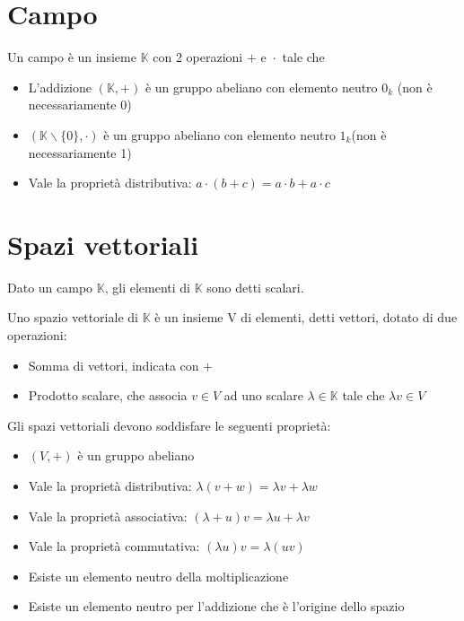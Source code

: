 \documentclass[a4paper, 10pt]{article}
\begin{document}
\section{Campo}

Un campo è un insieme $ \mathbb{K} $ con 2 operazioni $ + \text{ e } \cdot $ tale che

\begin{itemize}
	\item L'addizione $(\mathbb{K}, +)$ è un gruppo abeliano con elemento neutro $ 0_k $ (non è necessariamente 0)
	\item $(\mathbb{K} \backslash \{0\}, \cdot)$ è un gruppo abeliano con elemento neutro $ 1_k $(non è necessariamente 1)
	\item Vale la proprietà distributiva: $ a \cdot (b+c)=a \cdot b+a \cdot c $
\end{itemize}

\section{Spazi vettoriali}

Dato un campo $ \mathbb{K} $, gli elementi di $ \mathbb{K} $ sono detti scalari.

Uno spazio vettoriale di $ \mathbb{K} $ è un insieme V di elementi, detti vettori, dotato di due operazioni:

\begin{itemize}
	\item Somma di vettori, indicata con $ + $
	\item Prodotto scalare, che associa $ v \in V $ ad uno scalare $ \lambda \in \mathbb{K} $ tale che $ \lambda v \in V$
\end{itemize}

Gli spazi vettoriali devono soddisfare le seguenti proprietà:

\begin{itemize}
	\item $ (V, +) $ è un gruppo abeliano
	\item Vale la proprietà distributiva: $ \lambda\left(v+w\right)=\lambda v+\lambda w $
	\item Vale la proprietà associativa: $ \left(\lambda+u\right)v=\lambda u+\lambda v $ 
	\item Vale la proprietà commutativa: $ \left(\lambda u\right)v=\lambda\left(uv\right) $
	\item Esiste un elemento neutro della moltiplicazione
	\item Esiste un elemento neutro per l'addizione che è l'origine dello spazio
\end{itemize}
\end{document}
